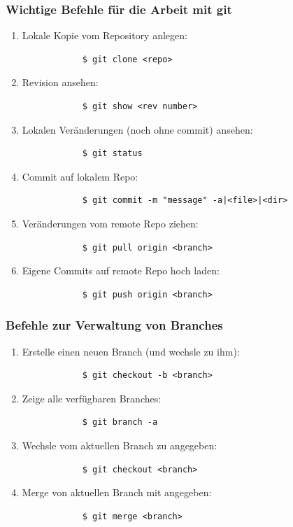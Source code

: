 \documentclass[ucs,9pt]{beamer}
\begin{document}
  \begin{frame}[fragile]
    \frametitle{Wichtige Befehle für die Arbeit mit git}
    \begin{enumerate}
        \item Lokale Kopie vom Repository anlegen:
            \begin{verbatim}
            $ git clone <repo>
            \end{verbatim}
        \item Revision ansehen:
            \begin{verbatim}
            $ git show <rev number>
            \end{verbatim}
        \item Lokalen Veränderungen (noch ohne commit) ansehen:
            \begin{verbatim}
            $ git status
            \end{verbatim}
        \item Commit auf lokalem Repo:
            \begin{verbatim}
            $ git commit -m "message" -a|<file>|<dir>
            \end{verbatim}
        \item Veränderungen vom remote Repo ziehen:
            \begin{verbatim}
            $ git pull origin <branch>
            \end{verbatim}
        \item Eigene Commits auf remote Repo hoch laden:
            \begin{verbatim}
            $ git push origin <branch>
            \end{verbatim}
    \end{enumerate}
\end{frame}

\begin{frame}[fragile]
    \frametitle{Befehle zur Verwaltung von Branches}
    \begin{enumerate}
        \item Erstelle einen neuen Branch (und wechsle zu ihm):
            \begin{verbatim}
            $ git checkout -b <branch>
            \end{verbatim}
        \item Zeige alle verfügbaren Branches:
            \begin{verbatim}
            $ git branch -a
            \end{verbatim}
        \item Wechsle vom aktuellen Branch zu angegeben:
            \begin{verbatim}
            $ git checkout <branch>
            \end{verbatim}
        \item Merge von aktuellen Branch mit angegeben:
            \begin{verbatim}
            $ git merge <branch>
            \end{verbatim}
    \end{enumerate}
\end{frame}
\end{document}
